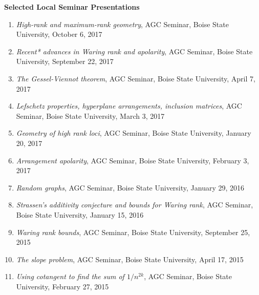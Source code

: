 \documentclass[12pt]{article}
\begin{document}
\textbf{Selected Local Seminar Presentations}
\begin{enumerate}
\item \textit{High-rank and maximum-rank geometry},
AGC Seminar, Boise State University, October 6, 2017
\item \textit{Recent* advances in Waring rank and apolarity},
AGC Seminar, Boise State University, September 22, 2017
\item \textit{The Gessel-Viennot theorem},
AGC Seminar, Boise State University, April 7, 2017
\item \textit{Lefschetz properties, hyperplane arrangements, inclusion matrices},
AGC Seminar, Boise State University, March 3, 2017
\item \textit{Geometry of high rank loci},
AGC Seminar, Boise State University, January 20, 2017
\item \textit{Arrangement apolarity},
AGC Seminar, Boise State University, February 3, 2017
\item \textit{Random graphs},
AGC Seminar, Boise State University, January 29, 2016
\item \textit{Strassen's additivity conjecture and bounds for Waring rank},
AGC Seminar, Boise State University, January 15, 2016
\item \textit{Waring rank bounds},
AGC Seminar, Boise State University, September 25, 2015
\item \textit{The slope problem},
AGC Seminar, Boise State University, April 17, 2015
\item \textit{Using cotangent to find the sum of $1/n^{2k}$},
AGC Seminar, Boise State University, February 27, 2015

\end{enumerate}
\end{document}
